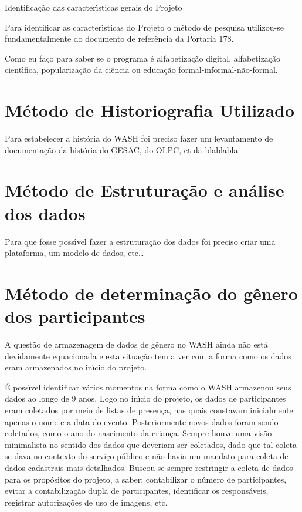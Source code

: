 \documentclass[
12pt,		%
openright,	%
twoside,  %
a4paper,			%
chapter=TITLE,		%
english,			%
french,				%
spanish,			%
brazil				%
]{USPSC-classe/USPSC}
\begin{document}
Identifica\c{c}\~ao das caracter\'{\i}sticas gerais do Projeto




Para identificar as caracter\'{\i}sticas do Projeto o m\'etodo de pesquisa utilizou-se fundamentalmente do documento de refer\^encia da Portaria 178.




Como eu fa\c{c}o para saber se o programa \'e alfabetiza\c{c}\~ao digital, alfabetiza\c{c}\~ao cient\'{\i}fica, populariza\c{c}\~ao da ci\^encia ou educa\c{c}\~ao formal-informal-n\~ao-formal.




\section[M\'etodo de Historiografia Utilizado ]{M\'etodo de Historiografia Utilizado }\label{M\'etodo de Historiografia Utilizado }
Para estabelecer a hist\'oria do WASH foi preciso fazer um levantamento de documenta\c{c}\~ao da hist\'oria do GESAC, do OLPC, et da blablabla




\section[M\'etodo de Estrutura\c{c}\~ao e an\'alise dos dados]{M\'etodo de Estrutura\c{c}\~ao e an\'alise dos dados}\label{M\'etodo de Estrutura\c{c}\~ao e an\'alise dos dados}
Para que fosse poss\'{\i}vel fazer a estrutura\c{c}\~ao dos dados foi preciso criar uma plataforma, um modelo de dados, etc…




\section[M\'etodo de determina\c{c}\~ao do g\^enero dos participantes]{M\'etodo de determina\c{c}\~ao do g\^enero dos participantes}\label{M\'etodo de determina\c{c}\~ao do g\^enero dos participantes}
A quest\~ao de armazenagem de dados de g\^enero no WASH ainda n\~ao est\'a devidamente equacionada e esta situa\c{c}\~ao tem a ver com a forma como os dados eram armazenados no in\'{\i}cio do projeto.




\'E poss\'{\i}vel identificar v\'arios momentos na forma como o WASH armazenou seus dados ao longo de 9 anos. Logo no in\'{\i}cio do projeto, os dados de participantes eram coletados por meio de listas de presen\c{c}a, nas quais constavam inicialmente apenas o nome e a data do evento. Posteriormente novos dados foram sendo coletados, como o ano do nascimento da crian\c{c}a. Sempre houve uma vis\~ao minimalista no sentido dos dados que deveriam ser coletados, dado que tal coleta se dava no contexto do servi\c{c}o p\'ublico e n\~ao havia um mandato para coleta de dados cadastrais mais detalhados. Buscou-se sempre restringir a coleta de dados para os prop\'ositos do projeto, a saber: contabilizar o n\'umero de participantes, evitar a contabiliza\c{c}\~ao dupla de participantes, identificar os respons\'aveis, registrar autoriza\c{c}\~oes de uso de imagens, etc.
\end{document}
